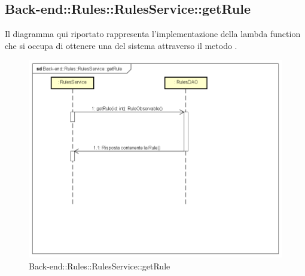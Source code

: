 \subsection{Back-end::Rules::RulesService::getRule}
Il diagramma qui riportato rappresenta l'implementazione della lambda function che si occupa di ottenere una  del sistema attraverso il metodo . 
\begin{figure}[h] \centering \includegraphics[width=\textwidth,height=\textheight,keepaspectratio]{images/diagrams/back-end/Ufficial_Backend/Back-endRulesRulesServicegetRule.png} 	\caption{Back-end::Rules::RulesService::getRule}
\end{figure} 
\newpage

